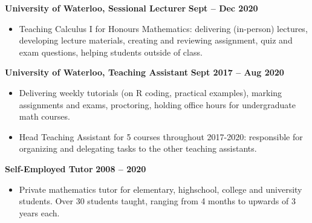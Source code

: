 \documentclass[11pt, oneside]{article}   	%
\begin{document}
\vspace{4pt}

\textbf{University of Waterloo, Sessional Lecturer} \hfill \textbf{Sept -- Dec 2020}
\vspace{-4pt}
\begin{itemize}
\item Teaching Calculus I for Honours Mathematics: delivering (in-person) lectures, developing lecture materials, creating and reviewing assignment, quiz and exam questions, helping students outside of class.
\end{itemize}

\vspace{4pt}

\textbf{University of Waterloo, Teaching Assistant} \hfill \textbf{Sept 2017 -- Aug 2020}
\vspace{-4pt}
\begin{itemize}
\item Delivering weekly tutorials (on R coding, practical examples), marking assignments and exams, proctoring, holding office hours  for undergraduate math courses.
\vspace{-4pt}
\item Head Teaching Assistant for 5 courses throughout 2017-2020: responsible for organizing and delegating tasks to the other teaching assistants.
\end{itemize}

\vspace{4pt}

\textbf{Self-Employed Tutor} \hfill \textbf{2008 -- 2020}
\vspace{-4pt}
\begin{itemize}
\item Private mathematics tutor for elementary, highschool, college and university students. Over 30 students taught, ranging from 4 months to upwards of 3 years each.
\end{itemize}
\end{document}
